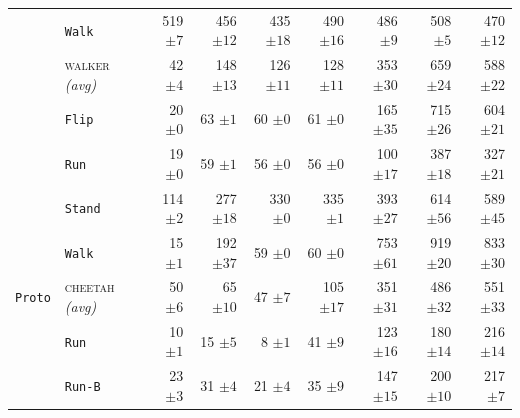 \documentclass{article}
\theoremstyle{plain}
\theoremstyle{definition}
\theoremstyle{remark}
\newcommand{\domainavg}[1]{\textsc{#1} \textit{(avg)}}
\begin{document}
\begin{table}
\begin{tabular}{l l r r r r r r r}
& \hspace{.5em}\texttt{Walk} & 519 ${\scriptstyle \pm 7}$ & 456 ${\scriptstyle \pm 12}$ & 435 ${\scriptstyle \pm 18}$ & 490 ${\scriptstyle \pm 16}$ & 486 ${\scriptstyle \pm 9}$ & 508 ${\scriptstyle \pm 5}$ & 470 ${\scriptstyle \pm 12}$ \\
\addlinespace
 \rowcolor{gray!15}  \cellcolor{white} & \domainavg{walker} & 42 ${\scriptstyle \pm 4}$ & 148 ${\scriptstyle \pm 13}$ & 126 ${\scriptstyle \pm 11}$ & 128 ${\scriptstyle \pm 11}$ & 353 ${\scriptstyle \pm 30}$ & 659 ${\scriptstyle \pm 24}$ & 588 ${\scriptstyle \pm 22}$ \\
& \hspace{.5em}\texttt{Flip} & 20 ${\scriptstyle \pm 0}$ & 63 ${\scriptstyle \pm 1}$ & 60 ${\scriptstyle \pm 0}$ & 61 ${\scriptstyle \pm 0}$ & 165 ${\scriptstyle \pm 35}$ & 715 ${\scriptstyle \pm 26}$ & 604 ${\scriptstyle \pm 21}$ \\
& \hspace{.5em}\texttt{Run} & 19 ${\scriptstyle \pm 0}$ & 59 ${\scriptstyle \pm 1}$ & 56 ${\scriptstyle \pm 0}$ & 56 ${\scriptstyle \pm 0}$ & 100 ${\scriptstyle \pm 17}$ & 387 ${\scriptstyle \pm 18}$ & 327 ${\scriptstyle \pm 21}$ \\
& \hspace{.5em}\texttt{Stand} & 114 ${\scriptstyle \pm 2}$ & 277 ${\scriptstyle \pm 18}$ & 330 ${\scriptstyle \pm 0}$ & 335 ${\scriptstyle \pm 1}$ & 393 ${\scriptstyle \pm 27}$ & 614 ${\scriptstyle \pm 56}$ & 589 ${\scriptstyle \pm 45}$ \\
& \hspace{.5em}\texttt{Walk} & 15 ${\scriptstyle \pm 1}$ & 192 ${\scriptstyle \pm 37}$ & 59 ${\scriptstyle \pm 0}$ & 60 ${\scriptstyle \pm 0}$ & 753 ${\scriptstyle \pm 61}$ & 919 ${\scriptstyle \pm 20}$ & 833 ${\scriptstyle \pm 30}$ \\
\addlinespace
\midrule
 \rowcolor{gray!15}  \cellcolor{white}\texttt{Proto} & \domainavg{cheetah} & 50 ${\scriptstyle \pm 6}$ & 65 ${\scriptstyle \pm 10}$ & 47 ${\scriptstyle \pm 7}$ & 105 ${\scriptstyle \pm 17}$ & 351 ${\scriptstyle \pm 31}$ & 486 ${\scriptstyle \pm 32}$ & 551 ${\scriptstyle \pm 33}$ \\
& \hspace{.5em}\texttt{Run} & 10 ${\scriptstyle \pm 1}$ & 15 ${\scriptstyle \pm 5}$ & 8 ${\scriptstyle \pm 1}$ & 41 ${\scriptstyle \pm 9}$ & 123 ${\scriptstyle \pm 16}$ & 180 ${\scriptstyle \pm 14}$ & 216 ${\scriptstyle \pm 14}$ \\
& \hspace{.5em}\texttt{Run-B} & 23 ${\scriptstyle \pm 3}$ & 31 ${\scriptstyle \pm 4}$ & 21 ${\scriptstyle \pm 4}$ & 35 ${\scriptstyle \pm 9}$ & 147 ${\scriptstyle \pm 15}$ & 200 ${\scriptstyle \pm 10}$ & 217 ${\scriptstyle \pm 7}$ \\

\end{tabular}
\end{table}
\end{document}
